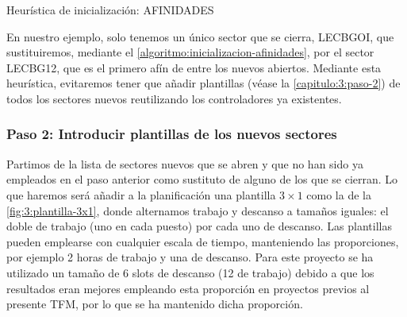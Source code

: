 \begin{algorithm}[H]
	\caption{Heurística de inicialización: AFINIDADES}
	\label{algoritmo:inicializacion-afinidades}
	
	\DontPrintSemicolon
	\medskip
	
	

\end{algorithm}


En nuestro ejemplo, solo tenemos un único sector que se cierra, LECBGOI, que sustituiremos, mediante el \autoref{algoritmo:inicializacion-afinidades}, por el sector LECBG12, que es el primero afín de entre los nuevos abiertos. Mediante esta heurística, evitaremos tener que añadir plantillas (véase la \autoref{capitulo:3:paso-2}) de todos los sectores nuevos reutilizando los controladores ya existentes.

\subsubsection{Paso 2: Introducir plantillas de los nuevos sectores} \label{capitulo:3:paso-2}

Partimos de la lista de sectores nuevos que se abren y que no han sido ya empleados en el paso anterior como sustituto de alguno de los que se cierran. Lo que haremos será añadir a la planificación una plantilla $3\times1$ como la de la 
\autoref{fig:3:plantilla-3x1}, donde alternamos trabajo y descanso a tamaños iguales: el doble de trabajo (uno en cada puesto) por cada uno de descanso. Las plantillas pueden emplearse con cualquier escala de tiempo, manteniendo las proporciones, por ejemplo 2 horas de trabajo y una de descanso.
Para este proyecto se ha utilizado un tamaño de 6 slots de descanso (12 de trabajo) debido a que los resultados eran mejores empleando esta proporción en proyectos previos al presente TFM, por lo que se ha mantenido dicha proporción.

